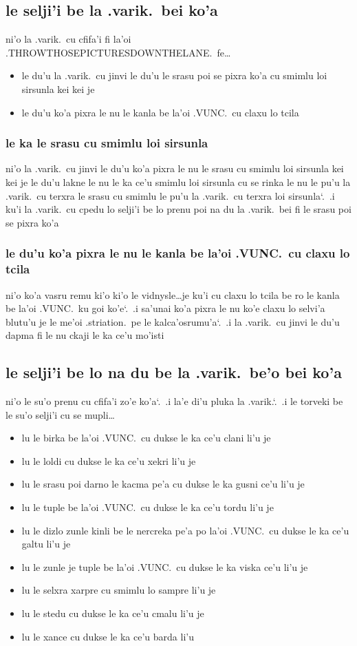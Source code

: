 \documentclass{report}
\newcommand\sds{\spacefactor\sfcode`.\ \space}
\begin{document}
\subsection{le selji'i be la .varik.\ bei ko'a}
ni'o la .varik.\ cu cfifa'i fi la'oi .THROWTHOSEPICTURESDOWNTHELANE.\ fe\ldots
\begin{itemize}
	\item le du'u la .varik.\ cu jinvi le du'u le srasu poi se pixra ko'a cu smimlu loi sirsunla kei kei je
	\item le du'u ko'a pixra le nu le kanla be la'oi .VUNC.\ cu claxu lo tcila
\end{itemize}

\subsubsection{le ka le srasu cu smimlu loi sirsunla}
ni'o la .varik.\ cu jinvi le du'u ko'a pixra le nu le srasu cu smimlu loi sirsunla kei kei je le du'u lakne le nu le ka ce'u smimlu loi sirsunla cu se rinka le nu le pu'u la .varik.\ cu terxra le srasu cu smimlu le pu'u la .varik.\ cu terxra loi sirsunla\sds  .i ku'i la .varik.\ cu cpedu lo selji'i be lo prenu poi na du la .varik.\ bei fi le srasu poi se pixra ko'a

\subsubsection{le du'u ko'a pixra le nu le kanla be la'oi .VUNC.\ cu claxu lo tcila}
ni'o ko'a vasru remu ki'o ki'o le vidnysle\ldots je ku'i cu claxu lo tcila be ro le kanla be la'oi .VUNC.\ ku goi ko'e\sds  .i sa'unai ko'a pixra le nu ko'e claxu lo selvi'a blutu'u je le me'oi .striation.\ pe le kalca'osrumu'a\sds  .i la .varik.\ cu jinvi le du'u dapma fi le nu ckaji le ka ce'u mo'isti

\subsection{le selji'i be lo na du be la .varik.\ be'o bei ko'a}
ni'o le su'o prenu cu cfifa'i zo'e ko'a\sds  .i la'e di'u pluka la .varik.\sds  .i le torveki be le su'o selji'i cu se mupli\ldots
\begin{itemize}
	\item lu le birka be la'oi .VUNC.\ cu dukse le ka ce'u clani li'u je
	\item lu le loldi cu dukse le ka ce'u xekri li'u je
	\item lu le srasu poi darno le kacma pe'a cu dukse le ka gusni ce'u li'u je
	\item lu le tuple be la'oi .VUNC.\ cu dukse le ka ce'u tordu li'u je
	\item lu le dizlo zunle kinli be le nercreka pe'a po la'oi .VUNC.\ cu dukse le ka ce'u galtu li'u je
	\item lu le zunle je tuple be la'oi .VUNC.\ cu dukse le ka viska ce'u li'u je
	\item lu le selxra xarpre cu smimlu lo sampre li'u je
	\item lu le stedu cu dukse le ka ce'u cmalu li'u je
	\item lu le xance cu dukse le ka ce'u barda li'u
\end{itemize}
\end{document}
